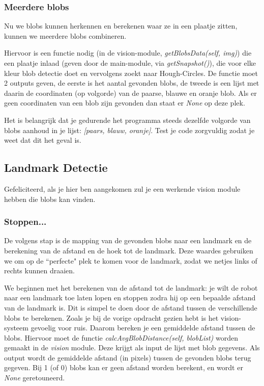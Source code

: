 \documentclass[a4paper]{article}
\begin{document}
\subsubsection{Meerdere blobs}
Nu we blobs kunnen herkennen en berekenen waar ze in een plaatje zitten, kunnen we meerdere blobs combineren.

Hiervoor is een functie nodig (in de vision-module, \textit{getBlobsData(self, img)}) die een plaatje inlaad (geven door de main-module, via \textit{getSnapshot()}), die voor elke kleur blob detectie doet en vervolgens zoekt  naar Hough-Circles. De functie moet 2 outputs geven, de eerste is het aantal gevonden blobs, de tweede is een lijst met daarin de coordinaten (op volgorde) van de paarse, blauwe en oranje blob. Als er geen coordinaten van een blob zijn gevonden dan staat er \textit{None} op deze plek. 

Het is belangrijk dat je gedurende het programma steeds dezelfde volgorde van blobs aanhoud in je lijst: \textit{[paars, blauw, oranje]}. Test je code zorgvuldig zodat je weet dat dit het geval is.

\subsection{Landmark Detectie}
Gefeliciteerd, als je hier ben aangekomen zul je een werkende vision module hebben die blobs kan vinden.

\subsubsection{Stoppen...}
De volgens stap is de mapping van de gevonden blobs naar een landmark en de berekening van de afstand en de hoek tot de landmark. Deze waardes gebruiken we om op de ``perfecte" plek te komen voor de landmark, zodat we netjes links of rechts kunnen draaien.

We beginnen met het berekenen van de afstand tot de landmark: je wilt de robot naar een landmark toe laten lopen en stoppen zodra hij op een bepaalde afstand van de landmark is. Dit is simpel te doen door de afstand tussen de verschillende blobs te berekenen. Zoals je bij de vorige opdracht gezien hebt is het vision-systeem gevoelig voor ruis. Daarom bereken je een gemiddelde afstand tussen de blobs. Hiervoor moet de functie \textit{calcAvgBlobDistance(self, blobList)} worden gemaakt in de \textit{vision} module. Deze krijgt als input de lijst met blob gegevens. Als output wordt de gemiddelde afstand (in pixels) tussen de gevonden blobs terug gegeven. Bij 1 (of 0) blobs kan er geen afstand worden berekent, en wordt er \textit{None} geretouneerd.
\end{document}
